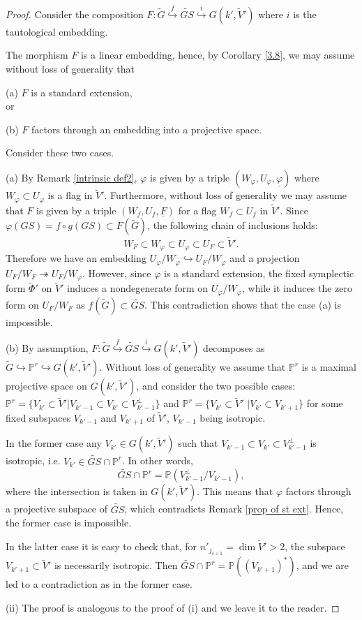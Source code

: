 \documentclass[12pt]{amsart}
\renewcommand{\phi}{\varphi}
\theoremstyle{definition}
\begin{document}
\begin{proof}
Consider the composition
$F:\tilde{G}\overset{f}\hookrightarrow \widetilde{GS}\overset{i}\hookrightarrow
G(k',\tilde{V}')$ where $i$ is the tautological embedding.

The morphism $F$ is a linear embedding, hence, by Corollary \ref{3.8}, we may assume
without loss of generality that

(a) $F$ is a standard extension,\\
or

(b) $F$ factors through an embedding into a projective space.

Consider these two cases.

(a) By Remark \ref{intrinsic def2},
$\phi$ is given by a triple $(W_{\phi},U_{\phi},\underline{\phi})$ where $W_{\phi}\subset U_{\phi}$ is a flag in
$\tilde{V}'$. Furthermore, without loss of generality we may assume that $F$ is given by a triple
$(W_f,U_f,\underline{F})$ for a flag $W_f\subset U_f$ in $\tilde{V}'$. Since $\phi(GS)=f\circ g(GS)\subset
F(\tilde{G})$, the following chain of inclusions holds:
$$
W_F\subset W_{\phi}\subset U_{\phi}\subset U_F\subset \tilde{V}'.
$$
Therefore we have an embedding $U_{\phi}/W_{\phi}\hookrightarrow U_F/W_{\phi}$ and a projection
$U_F/W_F\twoheadrightarrow U_F/W_{\phi}$. However, since $\phi$ is a standard extension, the fixed symplectic form
$\tilde{\Phi}'$ on $\tilde{V}'$ induces a nondegenerate form on $U_{\phi}/W_{\phi}$, while it induces the zero form on
$U_F/W_F$ as $f(\tilde{G})\subset\widetilde{GS}$.
This contradiction shows that the case (a) is impossible.

(b) By assumption, $F:\tilde{G}\overset{f}\hookrightarrow\widetilde{GS}\overset{i}\hookrightarrow G(k',\tilde{V}')$
decomposes as
$\tilde{G}\hookrightarrow\mathbb{P}^r\hookrightarrow G(k',\tilde{V}')$. Without loss of generality we assume that
$\mathbb{P}^r$ is a maximal projective space on $G(k',\tilde{V}')$, and consider the two possible cases:
$\mathbb{P}^r=\{V_{k'}\subset\tilde{V}'|V_{k'-1}\subset V_{k'}\subset V^\bot_{k'-1}\}$ and
$\mathbb{P}^r=\{V_{k'}\subset\tilde{V}'$
$|V_{k'}\subset V_{k'+1}\}$
for some fixed subspaces $V_{k'-1}$ and $V_{k'+1}$ of $\tilde{V}'$, $V_{k'-1}$ being isotropic.

In the former case any
$V_{k'}\in G(k',\tilde{V}')$ such that $V_{k'-1}\subset V_{k'}\subset V_{k'-1}^\bot$
is isotropic, i.e. $V_{k'}\in\widetilde{GS}\cap\mathbb{P}^r$. In other words,
$$
\widetilde{GS}\cap\mathbb{P}^r=\mathbb{P}(V_{k'-1}^\bot/V_{k'-1}),
$$
where the intersection is taken in $G(k',\tilde{V}')$. This means that $\phi$ factors through
a projective subspace of $\widetilde{GS}$, which contradicts Remark \ref{prop of st ext}.
Hence, the former case is impossible.

In the latter case it is easy to check that, for $n'_{j_{s+1}}=\dim\tilde{V}'>2$, the subspace
$V_{k'+1}\subset \tilde{V}'$ is necessarily isotropic. Then $\widetilde{GS}\cap\mathbb{P}^r=\mathbb{P}((V_{k'+1})^*)$,
and we are led to a contradiction as in the former case.

(ii) The proof is analogous to the proof of (i) and we leave it to the reader.
\end{proof}
\end{document}
